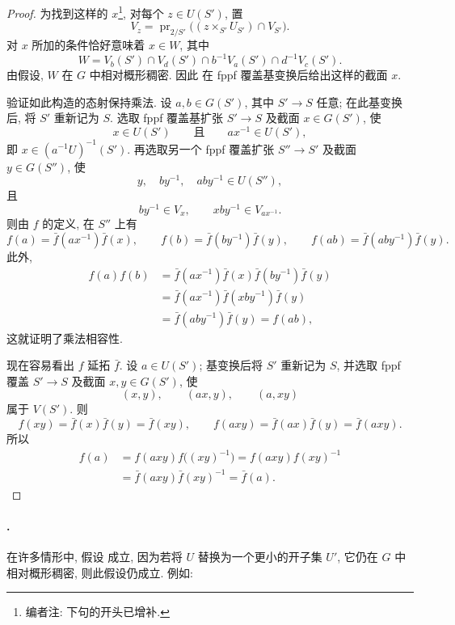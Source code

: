 \begin{proof}
为找到这样的 \(x\)\footnote{编者注: 下句的开头已增补.},
对每个 \(z\in U(S')\), 置
\[
  V_z=
  \operatorname{pr}_{2/S'}
  \bigl((z\times_{S'}U_{S'})\cap V_{S'}\bigr).
\]
对 \(x\) 所加的条件恰好意味着 \(x\in W\), 其中
\[
  W=
  V_b(S')\cap V_d(S')\cap
  b^{-1}V_a(S')\cap d^{-1}V_c(S').
\]
由假设\textup{},
\(W\) 在 \(G\) 中相对概形稠密.
因此 在 fppf 覆盖基变换后给出这样的截面 \(x\).

验证如此构造的态射保持乘法.
设 \(a,b\in G(S')\), 其中 \(S'\to S\) 任意;
在此基变换后, 将 \(S'\) 重新记为 \(S\).
选取 fppf 覆盖基扩张 \(S'\to S\) 及截面 \(x\in G(S')\), 使
\[
  x\in U(S')
  \qquad\text{且}\qquad
  ax^{-1}\in U(S'),
\]
即 \(x\in(a^{-1}U)^{-1}(S')\).
再选取另一个 fppf 覆盖扩张 \(S''\to S'\) 及截面 \(y\in G(S'')\), 使
\[
  y,\quad by^{-1},\quad aby^{-1}\in U(S''),
\]
且
\[
  by^{-1}\in V_x,
  \qquad
  xby^{-1}\in V_{ax^{-1}}.
\]
则由 \(f\) 的定义, 在 \(S''\) 上有
\[
  f(a)=\bar f(ax^{-1})\bar f(x),\qquad
  f(b)=\bar f(by^{-1})\bar f(y),\qquad
  f(ab)=\bar f(aby^{-1})\bar f(y).
\]
此外,
\[
\begin{aligned}
  f(a)f(b)
    &=\bar f(ax^{-1})\bar f(x)\bar f(by^{-1})\bar f(y)\\
    &=\bar f(ax^{-1})\bar f(xby^{-1})\bar f(y)\\
    &=\bar f(aby^{-1})\bar f(y)
     =f(ab),
\end{aligned}
\]
这就证明了乘法相容性.

现在容易看出 \(f\) 延拓 \(\bar f\).
设 \(a\in U(S')\); 基变换后将 \(S'\) 重新记为 \(S\),
并选取 fppf 覆盖 \(S'\to S\) 及截面 \(x,y\in G(S')\), 使
\[
  (x,y),\qquad (ax,y),\qquad (a,xy)
\]
属于 \(V(S')\). 则
\[
  f(xy)=\bar f(x)\bar f(y)=\bar f(xy),
  \qquad
  f(axy)=\bar f(ax)\bar f(y)=\bar f(axy).
\]
所以
\[
\begin{aligned}
  f(a)
    &=f(axy)f\bigl((xy)^{-1}\bigr)
     =f(axy)f(xy)^{-1}\\
    &=\bar f(axy)\bar f(xy)^{-1}
     =\bar f(a).
\end{aligned}
\]
\end{proof}

\paragraph{.}
在许多情形中, 假设\textup{} 成立,
因为若将 \(U\) 替换为一个更小的开子集 \(U'\),
它仍在 \(G\) 中相对概形稠密, 则此假设仍成立. 例如:

